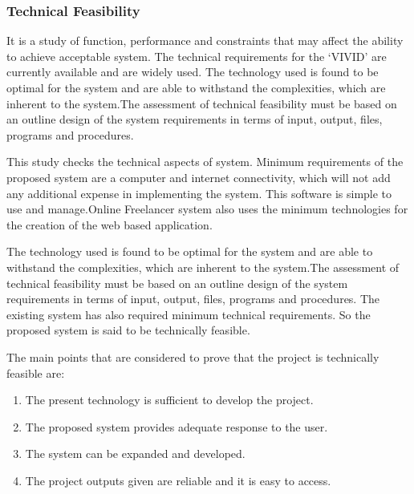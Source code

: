 \documentclass[a4paper,12pt]{article}
\begin{document}
\subsubsection{Technical Feasibility}\vspace{2mm}
               It is a study of function, performance and constraints that may affect the ability to achieve acceptable system. The technical requirements for the ‘VIVID’ are currently available and are widely used. The technology used is found to be optimal for the system and are able to withstand the complexities, which are inherent to the system.The assessment of technical feasibility must be based on an outline design of the system requirements in terms of input, output, files, programs and procedures.
\par\vspace{2mm}
 This study checks the technical aspects of system. Minimum requirements of the proposed system are a computer and internet connectivity, which will not add any additional expense in implementing the system. This software is simple to use and manage.Online Freelancer system also uses the minimum technologies for the creation of the web based application. 
\par\vspace{2mm}
The technology used is found to be optimal for the system and are able to withstand the complexities, which are inherent to the system.The assessment of technical feasibility must be based on an outline design of the system requirements in terms of input, output, files, programs and procedures. The existing system has also required minimum technical requirements. So the proposed system is said to be technically feasible.
\par\vspace{2mm} The main points that are considered to prove that the project is technically feasible are:
\begin{enumerate}
\item The present technology is sufficient to develop the project.
\item The proposed system provides adequate response to the user.
\item The system can be expanded and developed.
\item The project outputs given are reliable and it is easy to access.
\end{enumerate}
\newpage
\end{document}
